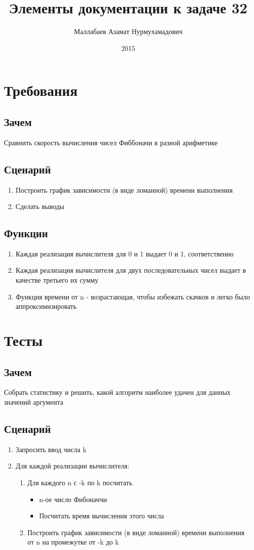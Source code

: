 \documentclass{article}
\title    {Элементы документации к задаче 32}
\author   {Маллабаев Азамат Нурмухамадович}
\date     {2015}
\begin{document}
  \maketitle
  \section{Требования}
  \subsection{Зачем}
    Сравнить скорость вычисления чисел Фиббоначи в разной арифметике
  \subsection{Сценарий}
  \begin{enumerate}
    \item Построить график зависимости (в виде ломанной) времени выполнения
    \item Сделать выводы
  \end{enumerate}
  \subsection{Функции}
  \begin{enumerate}
    \item Каждая реализация вычислителя для 0 и 1 выдает 0 и 1, соответственно
    \item Каждая реализация вычислителя для двух последовательных чисел выдает в качестве третьего их сумму
    \item Функция времени от n - возрастающая, чтобы избежать скачков и легко было аппроксимизировать
  \end{enumerate}
  \pagebreak
  \section{Тесты}
  \subsection{Зачем}
    Собрать статистику и решить, какой алгоритм наиболее удачен для данных значений аргумента
  \subsection{Сценарий}
  \begin{enumerate}
    \item Запросить ввод числа k
    \item Для каждой реализации вычислителя:
    \begin{enumerate}
      \item Для каждого n с -k по k посчитать
      \begin{itemize}
        \item n-ое число Фибоначчи
        \item Посчитать время вычисления этого числа
      \end{itemize}
      \item Построить график зависимости (в виде ломанной) времени выполнения от n на промежутке от -k до k
    \end{enumerate}
  \end{enumerate}
\end{document}
